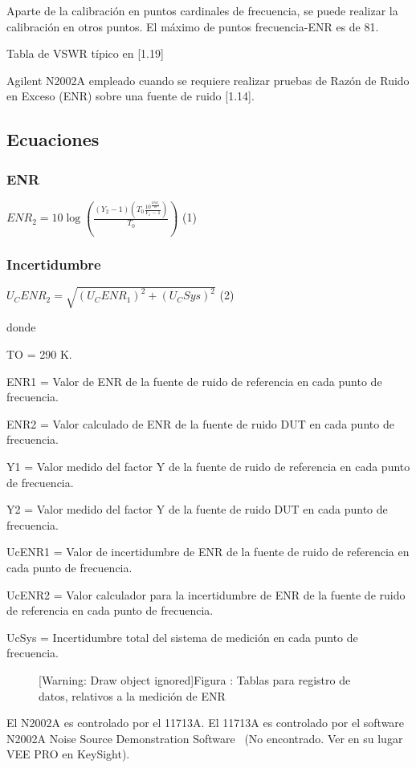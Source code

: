 \documentclass[paper=letter,oneside,fontsize=10pt,parskip=full]{article}
\newcounter{Drawing}
\renewcommand\theDrawing{\arabic{Drawing}}
\begin{document}
Aparte de la calibración en puntos cardinales de frecuencia, se puede realizar la calibración en otros puntos. El máximo
de puntos frecuencia-ENR es de 81.

Tabla de VSWR típico en [1.19]

Agilent N2002A empleado cuando se requiere realizar pruebas de Razón de Ruido en Exceso (ENR) sobre una fuente de ruido
[1.14]. 

\subsection{Ecuaciones }
\subsubsection{ENR}
 $\mathit{ENR}_2=10\log (\frac{(Y_2-1)(T_0\frac{10^{\frac{\mathit{ENR}_1}{10}}}{Y_1-1})}{T_0})$ (1)

\subsubsection{Incertidumbre}
 $U_C\mathit{ENR}_2=\sqrt{(U_C\mathit{ENR}_1)^2+(U_C\mathit{Sys})^2}$ (2)

donde

TO = 290 K.

ENR1 = Valor de ENR de la fuente de ruido de referencia en cada punto de frecuencia.

ENR2 = Valor calculado de ENR de la fuente de ruido DUT en cada punto de frecuencia.

Y1 = Valor medido del factor Y de la fuente de ruido de referencia en cada punto de frecuencia.

Y2 = Valor medido del factor Y de la fuente de ruido DUT en cada punto de frecuencia.

UcENR1 = Valor de incertidumbre de ENR de la fuente de ruido de referencia en cada punto de frecuencia.

UcENR2 = Valor calculador para la incertidumbre de ENR de la fuente de ruido de referencia en cada punto de frecuencia.

UcSys = Incertidumbre total del sistema de medición en cada punto de frecuencia.


\bigskip


\bigskip



\begin{figure}
\centering
\begin{minipage}{15.983cm}
[Warning: Draw object ignored]Figura {\theDrawing\label{seq:refDrawing5}}: Tablas para registro
de datos, relativos a la medición de ENR
\end{minipage}
\end{figure}
El N2002A es controlado por el 11713A. El 11713A es controlado por el software N2002A Noise Source Demonstration
Software \ (No encontrado. Ver en su lugar VEE PRO en KeySight).
\end{document}
